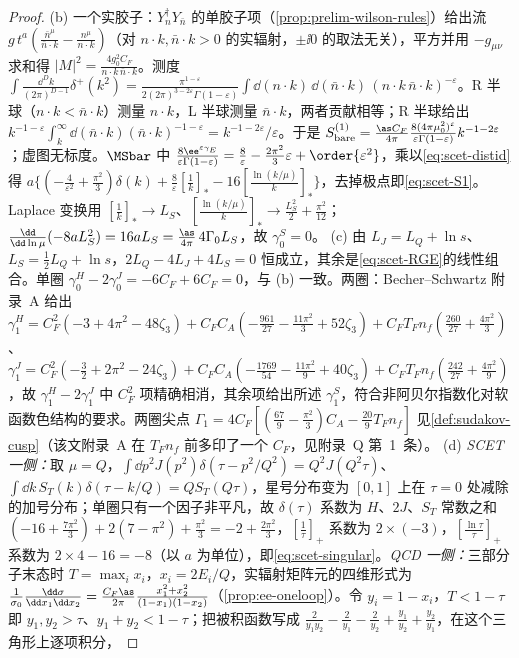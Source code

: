 \begin{proof}
(b) 一个实胶子：$Y_n^\dagger Y_{\bar n}$ 的单胶子项（\cref{prop:prelim-wilson-rules}）给出流 $g\,t^a(\frac{\bar n^\mu}{\bar n\cdot k}-\frac{n^\mu}{n\cdot k})$（对 $n\cdot k,\bar n\cdot k>0$ 的实辐射，$\pm\ii0$ 的取法无关），平方并用 $-g_{\mu\nu}$ 求和得 $|M|^2=\frac{4g_0^2C_F}{n\cdot k\,\bar n\cdot k}$。测度 $\int\frac{\dd^Dk}{(2\pi)^{D-1}}\delta^+(k^2)=\frac{\pi^{1-\varepsilon}}{2(2\pi)^{3-2\varepsilon}\Gamma(1-\varepsilon)}\int\dd(n\cdot k)\,\dd(\bar n\cdot k)\,(n\cdot k\,\bar n\cdot k)^{-\varepsilon}$。R 半球（$n\cdot k<\bar n\cdot k$）测量 $n\cdot k$，L 半球测量 $\bar n\cdot k$，两者贡献相等；R 半球给出 $k^{-1-\varepsilon}\int_k^\infty\dd(\bar n\cdot k)(\bar n\cdot k)^{-1-\varepsilon}=k^{-1-2\varepsilon}/\varepsilon$。于是 $S^{(1)}_{\rm bare}=\frac{\as C_F}{4\pi}\frac{8(4\pi\mu_0^2)^\varepsilon}{\varepsilon\Gamma(1-\varepsilon)}k^{-1-2\varepsilon}$；虚图无标度。$\MSbar$ 中 $\frac{8\ee^{\varepsilon\gamma_E}}{\varepsilon\Gamma(1-\varepsilon)}=\frac8\varepsilon-\frac{2\pi^2}{3}\varepsilon+\order{\varepsilon^2}$，乘以\cref{eq:scet-distid}得 $a\{(-\frac4{\varepsilon^2}+\frac{\pi^2}3)\delta(k)+\frac8\varepsilon[\frac1k]_*-16[\frac{\ln(k/\mu)}{k}]_*\}$，去掉极点即\cref{eq:scet-S1}。Laplace 变换用 $[\frac1k]_*\to L_S$、$[\frac{\ln(k/\mu)}k]_*\to\frac{L_S^2}2+\frac{\pi^2}{12}$；$\frac{\dd}{\dd\ln\mu}(-8aL_S^2)=16aL_S=\frac{\as}{4\pi}\,4\Gamma_0L_S$，故 $\gamma^S_0=0$。%
(c) 由 $L_J=L_Q+\ln s$、$L_S=\frac12L_Q+\ln s$，$2L_Q-4L_J+4L_S=0$ 恒成立，其余是\cref{eq:scet-RGE}的线性组合。单圈 $\gamma^H_0-2\gamma^J_0=-6C_F+6C_F=0$，与 (b) 一致。两圈：Becher--Schwartz 附录~A 给出\cite{BecherSchwartz2008}
$\gamma^H_1=C_F^2(-3+4\pi^2-48\zeta_3)+C_FC_A(-\frac{961}{27}-\frac{11\pi^2}{3}+52\zeta_3)+C_FT_Fn_f(\frac{260}{27}+\frac{4\pi^2}{3})$、$\gamma^J_1=C_F^2(-\frac32+2\pi^2-24\zeta_3)+C_FC_A(-\frac{1769}{54}-\frac{11\pi^2}{9}+40\zeta_3)+C_FT_Fn_f(\frac{242}{27}+\frac{4\pi^2}{9})$，故 $\gamma^H_1-2\gamma^J_1$ 中 $C_F^2$ 项精确相消，其余项给出所述 $\gamma^S_1$，符合非阿贝尔指数化对软函数色结构的要求。两圈尖点 $\Gamma_1=4C_F[(\frac{67}9-\frac{\pi^2}3)C_A-\frac{20}9T_Fn_f]$ 见\cref{def:sudakov-cusp}（该文附录~A 在 $T_Fn_f$ 前多印了一个 $C_F$，见附录~Q 第~1~条）。%
(d) \emph{SCET 一侧：}取 $\mu=Q$，$\int\dd p^2J(p^2)\delta(\tau-p^2/Q^2)=Q^2J(Q^2\tau)$、$\int\dd k\,S_T(k)\delta(\tau-k/Q)=QS_T(Q\tau)$，星号分布变为 $[0,1]$ 上在 $\tau=0$ 处减除的加号分布；单圈只有一个因子非平凡，故 $\delta(\tau)$ 系数为 $H$、$2J$、$S_T$ 常数之和 $(-16+\frac{7\pi^2}3)+2(7-\pi^2)+\frac{\pi^2}3=-2+\frac{2\pi^2}{3}$，$[\frac1\tau]_+$ 系数为 $2\times(-3)$，$[\frac{\ln\tau}\tau]_+$ 系数为 $2\times4-16=-8$（以 $a$ 为单位），即\cref{eq:scet-singular}。\emph{QCD 一侧：}三部分子末态时 $T=\max_ix_i$，$x_i=2E_i/Q$，实辐射矩阵元的四维形式为 $\frac1{\sigma_0}\frac{\dd\sigma}{\dd x_1\dd x_2}=\frac{C_F\as}{2\pi}\frac{x_1^2+x_2^2}{(1-x_1)(1-x_2)}$（\cref{prop:ee-oneloop}）。令 $y_i=1-x_i$，$T<1-\tau$ 即 $y_1,y_2>\tau$、$y_1+y_2<1-\tau$；把被积函数写成 $\frac{2}{y_1y_2}-\frac2{y_1}-\frac2{y_2}+\frac{y_1}{y_2}+\frac{y_2}{y_1}$，在这个三角形上逐项积分，

\end{proof}
